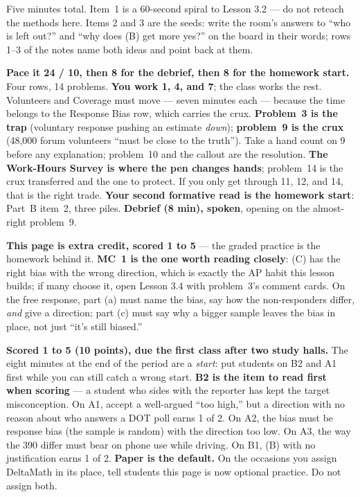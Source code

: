 \documentclass[10pt]{article}
\begin{document}
\begin{teachernote}[Warm-Up]
Five minutes total. Item~1 is a 60-second spiral to Lesson 3.2 --- do not reteach the methods
here. Items 2 and 3 are the seeds: write the room's answers to ``who is left out?'' and ``why
does (B) get more yes?'' on the board in their words; rows 1--3 of the notes name both ideas
and point back at them.
\end{teachernote}

\begin{teachernote}
\textbf{Pace it 24 / 10, then 8 for the debrief, then 8 for the homework start.} Four rows, 14
problems. \textbf{You work 1, 4, and 7}; the class works the rest. Volunteers and Coverage must
move --- seven minutes each --- because the time belongs to the Response Bias row, which
carries the crux. \textbf{Problem~3 is the trap} (voluntary response pushing an estimate
\emph{down}); \textbf{problem~9 is the crux} (48{,}000 forum volunteers ``must be close to the
truth''). Take a hand count on 9 before any explanation; problem~10 and the callout are the
resolution. \textbf{The Work-Hours Survey is where the pen changes hands}; problem~14 is the
crux transferred and the one to protect. If you only get through 11, 12, and 14, that is the
right trade. \textbf{Your second formative read is the homework start}: Part~B item~2, three
piles. \textbf{Debrief (8 min), spoken}, opening on the almost-right problem~9.
\end{teachernote}

\begin{teachernote}[AP Practice]
\textbf{This page is extra credit, scored 1 to 5} --- the graded practice is the homework
behind it. \textbf{MC~1 is the one worth reading closely}: (C) has the right bias with the
wrong direction, which is exactly the AP habit this lesson builds; if many choose it, open
Lesson 3.4 with problem~3's comment cards. On the free response, part (a) must name the bias,
say how the non-responders differ, \emph{and} give a direction; part (c) must say why a bigger
sample leaves the bias in place, not just ``it's still biased.''
\end{teachernote}

\begin{teachernote}[Homework]
\textbf{Scored 1 to 5 (10 points), due the first class after two study halls.} The eight minutes
at the end of the period are a \emph{start}: put students on B2 and A1 first while you can
still catch a wrong start. \textbf{B2 is the item to read first when scoring} --- a student who
sides with the reporter has kept the target misconception. On A1, accept a well-argued ``too
high,'' but a direction with no reason about who answers a DOT poll earns 1 of 2. On A2, the
bias must be response bias (the sample is random) with the direction too low. On A3, the way
the 390 differ must bear on phone use while driving. On B1, (B) with no justification earns
1 of 2. \textbf{Paper is the default.} On the occasions you assign DeltaMath in its place, tell
students this page is now optional practice. Do not assign both.
\end{teachernote}
\end{document}

